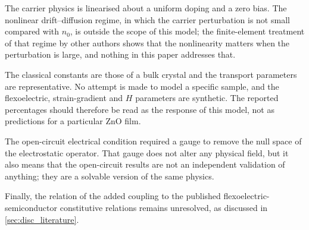 The carrier physics is linearised about a uniform doping and a zero bias.  The
nonlinear drift--diffusion regime, in which the carrier perturbation is not
small compared with $n_0$, is outside the scope of this model; the
finite-element treatment of that regime by other authors shows that the
nonlinearity matters when the perturbation is large, and nothing in this paper
addresses that.

The classical constants are those of a bulk crystal and the transport
parameters are representative.  No attempt is made to model a specific sample,
and the flexoelectric, strain-gradient and $H$ parameters are synthetic.  The
reported percentages should therefore be read as the response of this model, not
as predictions for a particular ZnO film.

The open-circuit electrical condition required a gauge to remove the null space
of the electrostatic operator.  That gauge does not alter any physical field,
but it also means that the open-circuit results are not an independent
validation of anything; they are a solvable version of the same physics.

Finally, the relation of the added coupling to the published
flexoelectric-semiconductor constitutive relations remains unresolved, as
discussed in \cref{sec:disc_literature}.
